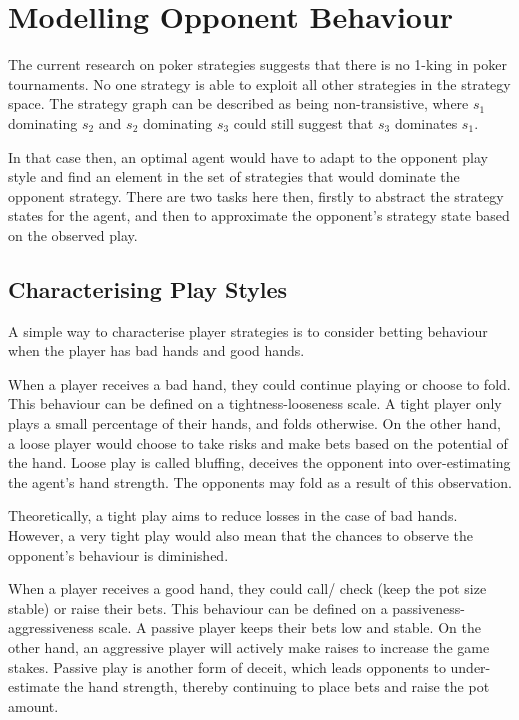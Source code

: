 \documentclass{article}
\begin{document}
\section{Modelling Opponent Behaviour}

The current research on poker strategies suggests that there is no 1-king in poker tournaments. No one strategy is able to exploit all other strategies in the strategy space. The strategy graph can be described as being non-transistive, where $s_1$ dominating $s_2$ and $s_2$ dominating $s_3$ could still suggest that $s_3$ dominates $s_1$.

In that case then, an optimal agent would have to adapt to the opponent play style and find an element in the set of strategies that would dominate the opponent strategy.  There are two tasks here then, firstly to abstract the strategy states for the agent, and then to approximate the opponent's strategy state based on the observed play.

\subsection{Characterising Play Styles}
A simple way to characterise player strategies is to consider betting behaviour when the player has bad hands and good hands. 

When a player receives a bad hand, they could continue playing or choose to fold. This behaviour can be defined on a tightness-looseness scale. A tight player only plays a small percentage of their hands, and folds otherwise. On the other hand, a loose player would choose to take risks and make bets based on the potential of the hand. Loose play is called bluffing, deceives the opponent into over-estimating the agent's hand strength. The opponents may fold as a result of this observation.

Theoretically, a tight play aims to reduce losses in the case of bad hands. However, a very tight play would also mean that the chances to observe the opponent's behaviour is diminished.

When a player receives a good hand, they could call/ check (keep the pot size stable) or raise their bets. This behaviour can be defined on a passiveness-aggressiveness scale. A passive player keeps their bets low and stable. On the other hand, an aggressive player will actively make raises to increase the game stakes. Passive play is another form of deceit, which leads opponents to under-estimate the hand strength, thereby continuing to place bets and raise the pot amount.
\end{document}
